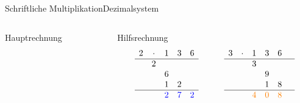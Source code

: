 \documentclass[xelatex,aspectratio=169]{beamer}
\begin{document}
\begin{frame}[t]{Schriftliche Multiplikation}{Dezimalsystem}
{\begin{columns}
\begin{column}{0.33\textwidth}
\begin{block}{Hauptrechnung}
        \end{block}
      \end{column}
      \begin{column}{0.67\textwidth}
        \begin{block}{Hilfsrechnung}
          \[
            \begin{matrix}
              2 & \cdot & 1                   & 3                   & 6                   \\
              \hline
                & 2     &                     &                     &                     \\
                &       & 6                   &                                           \\
                &       & 1                   & 2                                         \\
              \hline
                &       & \textcolor{blue}{2} & \textcolor{blue}{7} & \textcolor{blue}{2} \\
            \end{matrix} \qquad\qquad \begin{matrix}
              3 & \cdot & 1                     & 3                     & 6                       \\
              \hline
                &       & 3                     &                       &                       & \\
                &       &                       & 9                     &                         \\
                &       &                       & 1                     & 8                       \\
              \hline
                &       & \textcolor{orange}{4} & \textcolor{orange}{0} & \textcolor{orange}{8}   \\
            \end{matrix}
          \]
        \end{block}
      \end{column}
    \end{columns}
  }
\end{frame}
\end{document}
